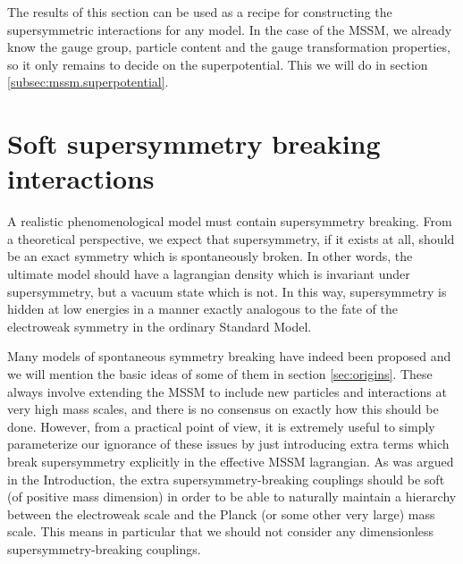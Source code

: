 The results of this section can be used as a recipe for constructing
the supersymmetric interactions for any model. In the case of the MSSM,
we already know the gauge group, particle content and the gauge
transformation
properties, so it only remains to decide on the superpotential. This
we will do in section \ref{subsec:mssm.superpotential}.

\section{Soft supersymmetry breaking interactions}\label{sec:soft}
\setcounter{equation}{0}
\setcounter{footnote}{1}

A realistic phenomenological model must contain supersymmetry
breaking. From a theoretical perspective, we expect that supersymmetry,
if it exists at all, should be an exact symmetry which is spontaneously
broken. In other words,
the ultimate model should have a lagrangian density which
is invariant under supersymmetry, but a vacuum state which is not.
In this way, supersymmetry is hidden
at low energies in a manner exactly analogous to
the fate of the electroweak symmetry in the ordinary
Standard Model.

Many models of spontaneous symmetry breaking have indeed been proposed
and we will mention the basic ideas of some of them in section
\ref{sec:origins}.
These always involve extending the MSSM to include new particles
and interactions at very high mass scales, and there is no consensus
on exactly how this should be done. However, from a practical
point of view, it is extremely useful to simply parameterize our ignorance
of these issues by just introducing extra terms
which break supersymmetry explicitly in the effective MSSM lagrangian.
As was argued in the Introduction, the extra supersymmetry-breaking
couplings should be soft (of positive mass dimension) in
order to be able to naturally maintain a hierarchy between the electroweak
scale and the Planck (or some other very large) mass scale. This means in
particular that we
should not consider any dimensionless supersymmetry-breaking couplings.

